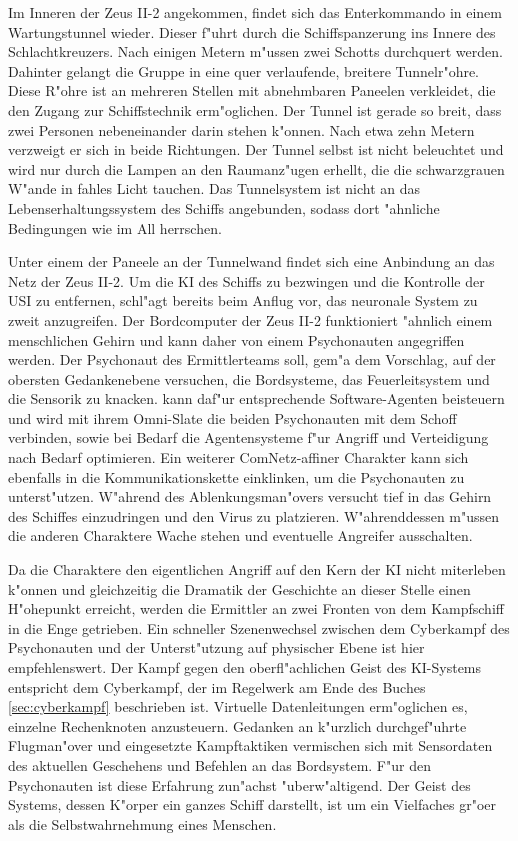 Im Inneren der Zeus II-2 angekommen, findet sich das Enterkommando in einem Wartungstunnel wieder. Dieser f"uhrt durch die Schiffspanzerung ins Innere des Schlachtkreuzers. Nach einigen Metern m"ussen zwei Schotts durchquert werden. Dahinter gelangt die Gruppe in eine quer verlaufende, breitere Tunnelr"ohre. Diese R"ohre ist an mehreren Stellen mit abnehmbaren Paneelen verkleidet, die den Zugang zur Schiffstechnik erm"oglichen. Der Tunnel ist gerade so breit, dass zwei Personen nebeneinander darin stehen k"onnen. Nach etwa zehn Metern verzweigt er sich in beide Richtungen. Der Tunnel selbst ist nicht beleuchtet und wird nur durch die Lampen an den Raumanz"ugen erhellt, die die schwarzgrauen W"ande in fahles Licht tauchen. Das Tunnelsystem ist nicht an das Lebenserhaltungssystem des Schiffs angebunden, sodass dort "ahnliche Bedingungen wie im All herrschen.

Unter einem der Paneele an der Tunnelwand findet sich eine Anbindung an das Netz der Zeus II-2. Um die KI des Schiffs zu bezwingen und die Kontrolle der USI zu entfernen, schl"agt \xl{} bereits beim Anflug vor, das neuronale System zu zweit anzugreifen. Der Bordcomputer der Zeus II-2 funktioniert "ahnlich einem menschlichen Gehirn und kann daher von einem Psychonauten angegriffen werden. Der Psychonaut des Ermittlerteams soll, gem"a\3 dem Vorschlag, auf der obersten Gedankenebene versuchen, die Bordsysteme, das Feuerleitsystem und die Sensorik zu knacken. \ml{} kann daf"ur entsprechende Software-Agenten beisteuern und wird mit ihrem Omni-Slate die beiden Psychonauten mit dem Schoff verbinden, sowie bei Bedarf die Agentensysteme f"ur Angriff und Verteidigung nach Bedarf optimieren. Ein weiterer ComNetz-affiner Charakter kann sich ebenfalls in die Kommunikationskette einklinken, um die Psychonauten zu unterst"utzen. W"ahrend des Ablenkungsman"overs versucht \xl{} tief in das Gehirn des Schiffes einzudringen und den Virus zu platzieren. W"ahrenddessen m"ussen die anderen Charaktere Wache stehen und eventuelle Angreifer ausschalten.

Da die Charaktere den eigentlichen Angriff auf den Kern der KI nicht miterleben k"onnen und gleichzeitig die Dramatik der Geschichte an dieser Stelle einen H"ohepunkt erreicht, werden die Ermittler an zwei Fronten von dem Kampfschiff in die Enge getrieben. Ein schneller Szenenwechsel zwischen dem Cyberkampf des Psychonauten und der Unterst"utzung auf physischer Ebene ist hier empfehlenswert. Der Kampf gegen den oberfl"achlichen Geist des KI-Systems entspricht dem Cyberkampf, der im Regelwerk am Ende des Buches  \cref{sec:cyberkampf} beschrieben ist. Virtuelle Datenleitungen erm"oglichen es, einzelne Rechenknoten anzusteuern. Gedanken an k"urzlich durchgef"uhrte Flugman"over und eingesetzte Kampftaktiken vermischen sich mit Sensordaten des aktuellen Geschehens und Befehlen an das Bordsystem. F"ur den Psychonauten ist diese Erfahrung zun"achst "uberw"altigend. Der Geist des Systems, dessen K"orper ein ganzes Schiff darstellt, ist um ein Vielfaches gr"o\3er als die Selbstwahrnehmung eines Menschen.

